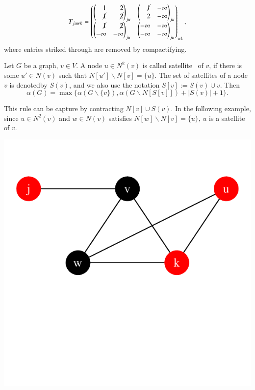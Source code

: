 \documentclass[review,onefignum,onetabnum]{siamart190516}
\newcommand{\<}{\langle}
\renewcommand{\>}{\rangle}
\newcounter{example}
\begin{document}
\begin{align}
    T_{juwk} = \left(\begin{matrix}
        \left(\begin{matrix}
        ~~~~1 & ~~~~2 \\
        ~~~~\cancel{1} & ~~~~\cancel{2}
        \end{matrix}\right)_{ju}&
        \left(\begin{matrix}
        ~~~~\cancel{1} & -\infty \\
        ~~~~2 & -\infty
        \end{matrix}\right)_{ju}\\
        \left(\begin{matrix}
        ~~~~\cancel{1} & ~~~~\cancel{2} \\
        -\infty & -\infty
        \end{matrix}\right)_{ju} &
        \left(\begin{matrix}
        -\infty & -\infty \\
        -\infty & -\infty
        \end{matrix}\right)_{ju}
    \end{matrix}\right)_{wk},
\end{align}
where entries striked through are removed by compactifying.


\begin{corollary} %
Let $G$ be a graph, $v \in V$. A node $u \in N^2(v)$ is called satellite~\cite{Kneis2009} of $v$, if there is some $u' \in N(v)$ such that $N[u'] \backslash N[v] = \{u\}$.
The set of satellites of a node $v$ is denotedby $S(v)$, and we also use the notation $S[v] := S(v) \cup {v}$. Then 
\begin{equation}
\alpha(G) = \max\{\alpha(G \backslash \{v\}), \alpha(G \backslash N[S[v]]) + |S(v)| + 1\}.
\end{equation}
\end{corollary}

This rule can be capture by contracting $N[v] \cup S(v)$.
In the following example, since $u \in N^2(v)$ and $w \in N(v)$ satisfies $N[w] \backslash N[v] = \{u\}$, $u$ is a satellite of $v$.

\centerline{\includegraphics[width=0.4\columnwidth,trim={0 3.5cm 0 1cm},clip]{../notebooks/satellite.pdf}}
\end{document}
